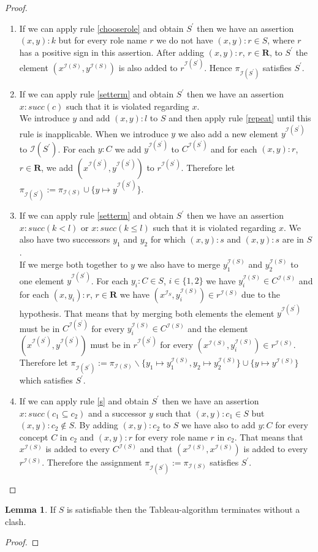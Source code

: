 \documentclass[a4paper,11pt]{scrartcl}
\theoremstyle{break}
\theoremstyle{definition}
\newtheorem{mylem}{Lemma}
\begin{document}
\begin{proof}
\begin{enumerate}
\item If we can apply rule \ref{chooserole} and obtain $S^\prime$ then we have an assertion $(x,y):k$ but for every role name $r$ we do not have $(x,y):r\in S$, where $r$ has a positive sign in this assertion. After adding $(x,y):r$, $r\in\mathbf{R}$, to $S^\prime$ the element $(x^{\mathcal{I}(S)},y^{\mathcal{I}(S)})$ is also added to $r^{\mathcal{I}(S^\prime)}$. Hence $\pi_{\mathcal{I}(S^\prime)}$ satisfies $S^\prime$.
\item If we can apply rule \ref{setterm} and obtain $S^\prime$ then we have an assertion $x:succ(c)$ such that it is violated regarding $x$.\\
We introduce $y$ and add $(x,y):l$ to $S$ and then apply rule \ref{repeat} until this rule is inapplicable. When we introduce $y$ we also add a new element $y^{\mathcal{I}(S^\prime)}$ to $\mathcal{I}(S^\prime)$. For each $y:C$ we add $y^{\mathcal{I}(S^\prime)}$ to $C^{\mathcal{I}(S^\prime)}$ and for each $(x,y):r$, $r\in\mathbf{R}$, we add $(x^{\mathcal{I}(S^\prime)},y^{\mathcal{I}(S^\prime)})$ to $r^{\mathcal{I}(S^\prime)}$. Therefore let $\pi_{\mathcal{I}(S^\prime)}:=\pi_{\mathcal{I}(S)}\cup \{y\mapsto y^{\mathcal{I}(S^\prime)}\}$.
\item If we can apply rule \ref{setterm} and obtain $S^\prime$ then we have an assertion $x:succ(k<l)$ or $x:succ(k\leq l)$ such that it is violated regarding $x$. We also have two successors $y_1$ and $y_2$ for which $(x,y):s$ and $(x,y):s$ are in $S$.\\
If we merge both together to $y$ we also have to merge $y_1^{\mathcal{I}(S)}$ and $y_2^{\mathcal{I}(S)}$ to one element $y^{\mathcal{I}(S^\prime)}$. For each $y_i:C\in S$, $i\in\{1,2\}$ we have $y_i^{\mathcal{I}(S)}\in C^{\mathcal{I}(S)}$ and for each $(x,y_i):r$, $r\in\mathbf{R}$ we have $(x^{\mathcal{I}_S},y_i^{\mathcal{I}(S)})\in r^{\mathcal{I}(S)}$ due to the hypothesis. That means that by merging both elements the element $y^{\mathcal{I}(S^\prime)}$ must be in $C^{\mathcal{I}(S^\prime)}$ for every $y_i^{\mathcal{I}(S)}\in C^{\mathcal{I}(S)}$ and the element $(x^{\mathcal{I}(S^\prime)},y^{\mathcal{I}(S^\prime)})$ must be in $r^{\mathcal{I}(S^\prime)}$ for every $(x^{\mathcal{I}(S)},y_i^{\mathcal{I}(S)})\in r^{\mathcal{I}(S)}$. Therefore let $\pi_{\mathcal{I}(S^\prime)}:=\pi_{\mathcal{I}(S)}\backslash\{y_1\mapsto y_1^{\mathcal{I}(S)}, y_2\mapsto y_2^{\mathcal{I}(S)}\}\cup\{y\mapsto y^{\mathcal{I}(S)}\}$ which satisfies $S^\prime$.
\item If we can apply rule \ref{s} and obtain $S^\prime$ then we have an assertion $x:succ(c_1\subseteq c_2)$ and a successor $y$ such that $(x,y):c_1\in S$ but $(x,y):c_2\notin S$. By adding $(x,y):c_2$ to $S$ we have also to add $y:C$ for every concept $C$ in $c_2$ and $(x,y):r$ for every role name $r$ in $c_2$. That means that $x^{\mathcal{I}(S)}$ is added to every $C^{\mathcal{I}(S)}$ and that $(x^{\mathcal{I}(S)},x^{\mathcal{I}(S)})$ is added to every $r^{\mathcal{I}(S)}$. Therefore the assignment $\pi_{\mathcal{I}(S^\prime)}:=\pi_{\mathcal{I}(S)}$ satisfies $S^\prime$.
\end{enumerate}
\end{proof}
\begin{mylem}
If $S$ is satisfiable then the Tableau-algorithm terminates without a clash.
\end{mylem}
\begin{proof}
\end{proof}
\fi
\normalem


\end{document}
